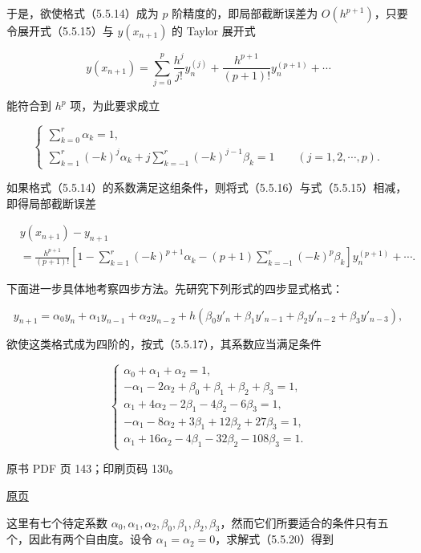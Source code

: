 于是，欲使格式（5.5.14）成为 \(p\) 阶精度的，即局部截断误差为 \(O(h^{p+1})\)，只要令展开式（5.5.15）与 \(y(x_{n+1})\) 的 Taylor 展开式

\[
y(x_{n+1})=\sum_{j=0}^p\frac{h^j}{j!}y_n^{(j)}+\frac{h^{p+1}}{(p+1)!}y_n^{(p+1)}+\cdots
\tag{5.5.16}
\]

能符合到 \(h^p\) 项，为此要求成立

\[
\begin{cases}
\displaystyle\sum_{k=0}^r\alpha_k=1,\\[6pt]
\displaystyle\sum_{k=1}^r(-k)^j\alpha_k+j\sum_{k=-1}^r(-k)^{j-1}\beta_k=1\qquad(j=1,2,\cdots,p).
\end{cases}
\tag{5.5.17}
\]

如果格式（5.5.14）的系数满足这组条件，则将式（5.5.16）与式（5.5.15）相减，即得局部截断误差

\[
\begin{aligned}
&y(x_{n+1})-y_{n+1}\\
&=\frac{h^{p+1}}{(p+1)!}\left[1-\sum_{k=1}^r(-k)^{p+1}\alpha_k-(p+1)\sum_{k=-1}^r(-k)^p\beta_k\right]y_n^{(p+1)}+\cdots.
\end{aligned}
\tag{5.5.18}
\]

下面进一步具体地考察四步方法。先研究下列形式的四步显式格式：

\[
y_{n+1}=\alpha_0y_n+\alpha_1y_{n-1}+\alpha_2y_{n-2}+h(\beta_0y'_n+\beta_1y'_{n-1}+\beta_2y'_{n-2}+\beta_3y'_{n-3}),
\tag{5.5.19}
\]

欲使这类格式成为四阶的，按式（5.5.17），其系数应当满足条件

\[
\begin{cases}
\alpha_0+\alpha_1+\alpha_2=1,\\
-\alpha_1-2\alpha_2+\beta_0+\beta_1+\beta_2+\beta_3=1,\\
\alpha_1+4\alpha_2-2\beta_1-4\beta_2-6\beta_3=1,\\
-\alpha_1-8\alpha_2+3\beta_1+12\beta_2+27\beta_3=1,\\
\alpha_1+16\alpha_2-4\beta_1-32\beta_2-108\beta_3=1.
\end{cases}
\tag{5.5.20}
\]

\clearpage

原书 PDF 页 143；印刷页码 130。

\href{source-images/pdf-143.jpeg}{原页}

这里有七个待定系数 \(\alpha_0,\allowbreak \alpha_1,\allowbreak \alpha_2,\allowbreak \beta_0,\allowbreak \beta_1,\allowbreak \beta_2,\allowbreak \beta_3\)，然而它们所要适合的条件只有五个，因此有两个自由度。设令 \(\alpha_1=\alpha_2=0\)，求解式（5.5.20）得到

